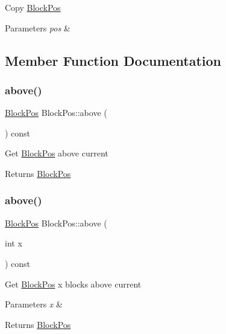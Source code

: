 Copy \mbox{\hyperlink{struct_block_pos}{Block\+Pos}} 
\begin{DoxyParams}{Parameters}
{\em pos} & \\
\hline
\end{DoxyParams}


\subsection{Member Function Documentation}
\mbox{\label{struct_block_pos_a6586d39744d7f375e04a4f893cbf0372}} 
\subsubsection{\texorpdfstring{above()}{above()}\hspace{0.1cm}{\footnotesize\ttfamily [1/2]}}
{\footnotesize\ttfamily \mbox{\hyperlink{struct_block_pos}{Block\+Pos}} Block\+Pos\+::above (\begin{DoxyParamCaption}{ }\end{DoxyParamCaption}) const}

Get \mbox{\hyperlink{struct_block_pos}{Block\+Pos}} above current \begin{DoxyReturn}{Returns}
\mbox{\hyperlink{struct_block_pos}{Block\+Pos}} 
\end{DoxyReturn}
\mbox{\label{struct_block_pos_a226d6174b5f844e3ec240386e3edff49}} 
\subsubsection{\texorpdfstring{above()}{above()}\hspace{0.1cm}{\footnotesize\ttfamily [2/2]}}
{\footnotesize\ttfamily \mbox{\hyperlink{struct_block_pos}{Block\+Pos}} Block\+Pos\+::above (\begin{DoxyParamCaption}\item[{int}]{x }\end{DoxyParamCaption}) const}

Get \mbox{\hyperlink{struct_block_pos}{Block\+Pos}} x blocks above current 
\begin{DoxyParams}{Parameters}
{\em x} & \\
\hline
\end{DoxyParams}
\begin{DoxyReturn}{Returns}
\mbox{\hyperlink{struct_block_pos}{Block\+Pos}} 
\end{DoxyReturn}
\mbox{\label{struct_block_pos_afa00519389de3ea611d087e4351cca69}} 
